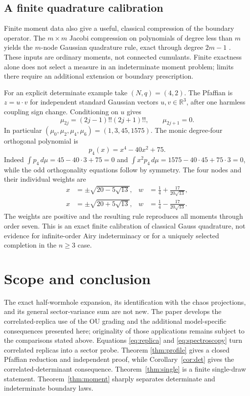 \documentclass[11pt,a4paper]{article}
\theoremstyle{definition}
\theoremstyle{remark}
\newcommand{\R}{\mathbb{R}}
\begin{document}
\subsection{A finite quadrature calibration}

Finite moment data also give a useful, classical compression of the boundary operator.
The $m\times m$ Jacobi compression on polynomials of degree less than $m$ yields the
$m$-node Gaussian quadrature rule, exact through degree $2m-1$
\citep{Akhiezer1965,Simon1998}.
These inputs are ordinary moments, not connected cumulants.
Finite exactness alone does not select a measure in an indeterminate moment problem;
limits there require an additional extension or boundary prescription.

For an explicit determinate example take $(N,q)=(4,2)$.
The Pfaffian is $z=u\cdot v$ for independent standard Gaussian vectors $u,v\in\R^3$,
after one harmless coupling sign change.
Conditioning on $u$ gives
\[
 \mu_{2j}=(2j-1)!!(2j+1)!!,\qquad \mu_{2j+1}=0.
\]
In particular $(\mu_0,\mu_2,\mu_4,\mu_6)=(1,3,45,1575)$.
The monic degree-four orthogonal polynomial is
\[
 p_4(x)=x^4-40x^2+75.
\]
Indeed $\int p_4\,d\mu=45-40\cdot3+75=0$ and
$\int x^2p_4\,d\mu=1575-40\cdot45+75\cdot3=0$, while the odd orthogonality equations
follow by symmetry.
The four nodes and their individual weights are
\begin{align*}
 x&=\pm\sqrt{20-5\sqrt{13}},&
 w&=\frac14+\frac{17}{20\sqrt{13}},\\
 x&=\pm\sqrt{20+5\sqrt{13}},&
 w&=\frac14-\frac{17}{20\sqrt{13}}.
\end{align*}
The weights are positive and the resulting rule reproduces all moments through order seven.
This is an exact finite calibration of classical Gauss quadrature, not evidence for
infinite-order Airy indeterminacy or for a uniquely selected completion in the $n\ge3$ case.

\section{Scope and conclusion}

The exact half-wormhole expansion, its identification with the chaos projections, and its
general sector-variance sum are not new. The paper develops the correlated-replica use of
the OU grading and the additional model-specific consequences presented here; originality
of those applications remains subject to the comparisons stated above.  Equations \eqref{eq:replica} and
\eqref{eq:spectroscopy} turn correlated replicas into a sector probe.  Theorem
\ref{thm:profile} gives a closed Pfaffian reduction and independent proof, while
Corollary~\ref{cor:det} gives the correlated-determinant consequence.  Theorem~\ref{thm:single} is a finite single-draw statement.
Theorem~\ref{thm:moment} sharply separates determinate and indeterminate boundary laws.
\end{document}
